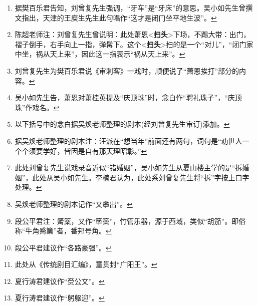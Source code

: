 \begin{enumerate}
\item
  \leavevmode\hypertarget{fn515}{}%
  据樊百乐君告知，刘曾复先生强调，``牙车''是``牙床''的意思。吴小如先生曾撰文指出，天津的王庾生先生此句唱作``这才是闭门坐平地生波''。\protect\hyperlink{fnref515}{↩}
\item
  \leavevmode\hypertarget{fn516}{}%
  陈超老师注：刘曾复先生曾说明：此处萧恩\textless{}\textbf{扫头}\textgreater{}下场，不踢大带：出门，褶子倒手，右手向上一指，弹髯下。这个\textless{}\textbf{扫头}\textgreater{}扫的是一个``对儿''，``闭门家中坐，祸从天上来''，因此这一指表示``祸从天上来''。\protect\hyperlink{fnref516}{↩}
\item
  \leavevmode\hypertarget{fn517}{}%
  刘曾复先生为樊百乐君说《审刺客》一戏时，顺便说了``萧恩挨打''部分的内容。\protect\hyperlink{fnref517}{↩}
\item
  \leavevmode\hypertarget{fn518}{}%
  吴小如先生告，萧恩对萧桂英提及``庆顶珠''时，念白作``聘礼珠子''，``庆顶珠''作戏名。\protect\hyperlink{fnref518}{↩}
\item
  \leavevmode\hypertarget{fn519}{}%
  以下括号中的念白据吴焕老师整理的剧本(经刘曾复先生审订)添加。\protect\hyperlink{fnref519}{↩}
\item
  \leavevmode\hypertarget{fn520}{}%
  据吴焕老师整理的剧本注：汪派在``想当年''前面还有两句，词句是``劝世人一个个须要学好，皆因是自有那天理昭彰。''\protect\hyperlink{fnref520}{↩}
\item
  \leavevmode\hypertarget{fn521}{}%
  此处刘曾复先生说戏录音近似``错婚姻''，吴小如先生从夏山楼主学的是``拆婚姻''，此处从吴小如先生。李楠君认为，此处系刘曾复先生将``拆''字按上口字处理。\protect\hyperlink{fnref521}{↩}
\item
  \leavevmode\hypertarget{fn522}{}%
  吴焕老师整理的剧本记作``又攀出''。\protect\hyperlink{fnref522}{↩}
\item
  \leavevmode\hypertarget{fn523}{}%
  段公平君注：觱篥，又作``筚篥''，竹管乐器，源于西域，类似``胡笳''。即俗称``牛角觱篥''者，番邦号角。\protect\hyperlink{fnref523}{↩}
\item
  \leavevmode\hypertarget{fn524}{}%
  段公平君建议作``各路豪强''。\protect\hyperlink{fnref524}{↩}
\item
  \leavevmode\hypertarget{fn525}{}%
  此处从《传统剧目汇编》，童贯封``广阳王''。\protect\hyperlink{fnref525}{↩}
\item
  \leavevmode\hypertarget{fn526}{}%
  夏行涛君建议作``赍公文''。\protect\hyperlink{fnref526}{↩}
\item
  \leavevmode\hypertarget{fn527}{}%
  夏行涛君建议作``躬躯迎''。\protect\hyperlink{fnref527}{↩}

\end{enumerate}
